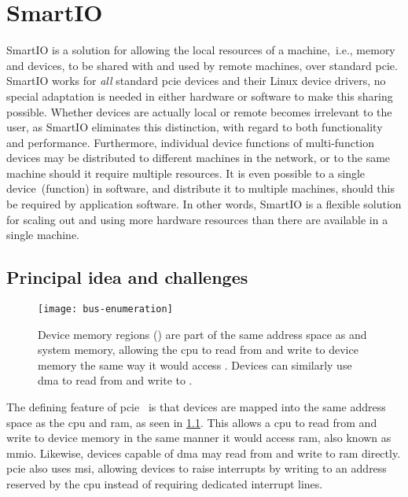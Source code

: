 \chapter{SmartIO}\label{chapter:smartio}
SmartIO is a solution for allowing the local resources of a machine,~i.e., memory and devices, to be shared with and used by remote machines, over standard \gls{pcie}.
%
SmartIO works for \emph{all} standard \gls{pcie} devices and their Linux device drivers, no special adaptation is needed in either hardware or software to make this sharing possible.
%
Whether devices are actually local or remote becomes irrelevant to the user, as SmartIO eliminates this distinction, with regard to both functionality and performance.
%
Furthermore, individual device functions of multi-function devices may be distributed to different machines in the network, or to the same machine should it require multiple resources.
%
It is even possible to  a single device~(function) in software, and distribute it to multiple machines, should this be required by application software.
%
In other words, SmartIO is a flexible solution for scaling out and using more hardware resources than there are available in a single machine.


\section{Principal idea and challenges}\label{sec:idea}
\begin{figure}
    \centering
    \texttt{[image: bus-enumeration]}
    \caption[Devices are part of the same address space as the  and system memory]
    {Device memory regions () are part of the same address space as  and system memory, allowing
    the \gls{cpu} to read from and write to device memory the same way it would access . Devices can similarly use \gls{dma} to read from and write to .}
    \label{fig:bus-enumeration}
\end{figure}
The defining feature of \gls{pcie}~\cite{spec:PCIe} is that devices are mapped into the same address space as the \gls{cpu} and \gls{ram}, as seen in \cref{fig:bus-enumeration}.
%
This allows a \gls{cpu} to read from and write to device memory in the same manner it would access \gls{ram}, also known as \gls{mmio}.
%
Likewise, devices capable of \gls{dma} may read from and write to \gls{ram} directly.
%
\Gls{pcie} also uses \gls{msi}, allowing devices to raise interrupts by writing to an address reserved by the \gls{cpu} instead of requiring dedicated interrupt lines.



